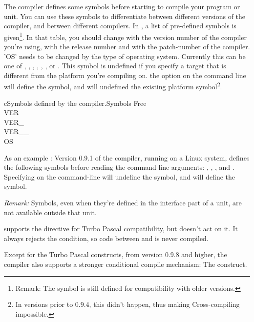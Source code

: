 \documentclass{report}
\begin{document}
The \fpc compiler defines some symbols before starting to compile your
program or unit. You can use these symbols to differentiate between
different versions of the compiler, and between different compilers.
In , a list of pre-defined symbols is given\footnote{Remark:
The  symbol is still defined for compatibility with older versions.}. In that table,
you should change  with the version number of the compiler
you're using,  with the release number and 
with the patch-number of the compiler. 'OS' needs to be changed by the type
of operating system. Currently this can be one of , ,
, , , ,  or . This symbol is undefined if you
specify a target that is different from the platform you're compiling on.
the  option on the command line will define the  symbol,
and will undefined the existing platform symbol\footnote{In versions prior to
0.9.4, this didn't happen, thus making Cross-compiling impossible.}.

\begin{FPCltable}{c}{Symbols defined by the compiler.}{Symbols} \hline
Free \\
VER \\
VER\_ \\
VER\_\_ \\
OS \\ \hline
\end{FPCltable}

As an example : Version 0.9.1 of the compiler, running on a Linux system,
defines the following symbols before reading the command line arguments:
, , ,  and .
Specifying  on the command-line will undefine the 
symbol, and will define the  symbol. 

{\em Remark: } Symbols, even when they're defined in the interface part of 
a unit, are not available outside that unit.

\fpc supports the  directive for Turbo Pascal
compatibility, but doesn't act on it. It always rejects the condition, so
code between  and  is never compiled.

Except for the Turbo Pascal constructs, from version 0.9.8 and higher,
the \fpc compiler also supports a stronger conditional compile mechanism:
The  construct. 
\end{document}
